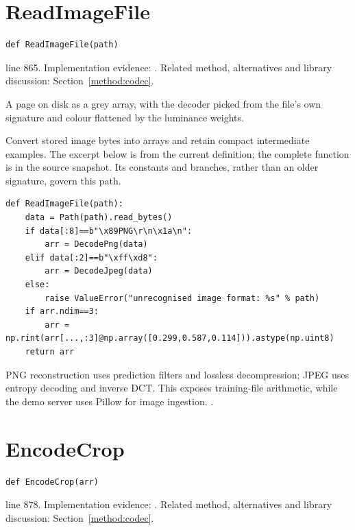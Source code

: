\section{ReadImageFile}\label{fn:train:ReadImageFile}
\begin{lstlisting}[style=sig]
def ReadImageFile(path)
\end{lstlisting}
 line 865. Implementation evidence: \cite{code2026}. Related method, alternatives and library discussion: Section~\ref{method:codec}.


A page on disk as a grey array, with the decoder picked from the file's own signature and colour flattened by the luminance weights.


Convert stored image bytes into arrays and retain compact intermediate examples. The excerpt below is from the current definition; the complete function is in the source snapshot. Its constants and branches, rather than an older signature, govern this path.


\begin{lstlisting}[style=plain]
def ReadImageFile(path):
    data = Path(path).read_bytes()
    if data[:8]==b"\x89PNG\r\n\x1a\n":
        arr = DecodePng(data)
    elif data[:2]==b"\xff\xd8":
        arr = DecodeJpeg(data)
    else:
        raise ValueError("unrecognised image format: %s" % path)
    if arr.ndim==3:
        arr = np.rint(arr[...,:3]@np.array([0.299,0.587,0.114])).astype(np.uint8)
    return arr
\end{lstlisting}
PNG reconstruction uses prediction filters and lossless decompression; JPEG uses entropy decoding and inverse DCT. This exposes training-file arithmetic, while the demo server uses Pillow for image ingestion. \cite{pngspec,jpegspec,pillowimage}.


\section{EncodeCrop}\label{fn:train:EncodeCrop}
\begin{lstlisting}[style=sig]
def EncodeCrop(arr)
\end{lstlisting}
 line 878. Implementation evidence: \cite{code2026}. Related method, alternatives and library discussion: Section~\ref{method:codec}.


